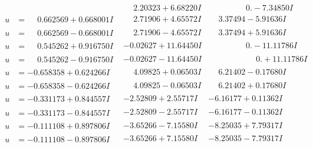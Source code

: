 \documentclass[1p]{elsarticle_modified}
\theoremstyle{definition}
\begin{document}
$$\begin{array}{c|c|c}
 & \phantom{-}2.20323 + 6.68220 I & \phantom{-0.000000 } 0. - 7.34850 I \\ \hline\begin{aligned}
u &= \phantom{-}0.662569 + 0.668001 I\end{aligned}
 & \phantom{-}2.71906 + 4.65572 I & \phantom{-}3.37494 - 5.91636 I \\ \hline\begin{aligned}
u &= \phantom{-}0.662569 - 0.668001 I\end{aligned}
 & \phantom{-}2.71906 - 4.65572 I & \phantom{-}3.37494 + 5.91636 I \\ \hline\begin{aligned}
u &= \phantom{-}0.545262 + 0.916750 I\end{aligned}
 & -0.02627 + 11.64450 I & \phantom{-0.000000 } 0. - 11.11786 I \\ \hline\begin{aligned}
u &= \phantom{-}0.545262 - 0.916750 I\end{aligned}
 & -0.02627 - 11.64450 I & \phantom{-0.000000 -}0. + 11.11786 I \\ \hline\begin{aligned}
u &= -0.658358 + 0.624266 I\end{aligned}
 & \phantom{-}4.09825 + 0.06503 I & \phantom{-}6.21402 - 0.17680 I \\ \hline\begin{aligned}
u &= -0.658358 - 0.624266 I\end{aligned}
 & \phantom{-}4.09825 - 0.06503 I & \phantom{-}6.21402 + 0.17680 I \\ \hline\begin{aligned}
u &= -0.331173 + 0.844557 I\end{aligned}
 & -2.52809 + 2.55717 I & -6.16177 + 0.11362 I \\ \hline\begin{aligned}
u &= -0.331173 - 0.844557 I\end{aligned}
 & -2.52809 - 2.55717 I & -6.16177 - 0.11362 I \\ \hline\begin{aligned}
u &= -0.111108 + 0.897806 I\end{aligned}
 & -3.65266 - 7.15580 I & -8.25035 + 7.79317 I \\ \hline\begin{aligned}
u &= -0.111108 - 0.897806 I\end{aligned}
 & -3.65266 + 7.15580 I & -8.25035 - 7.79317 I \\ \hline\begin{aligned}

\end{aligned}
\end{array}$$
\end{document}
